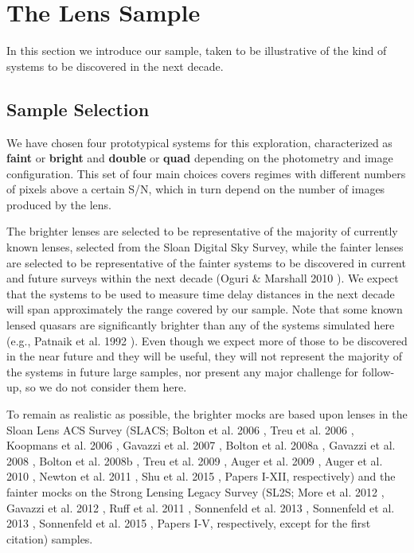 \documentclass[a4paper,11pt]{article}
\begin{document}
{\section{The Lens Sample}

In this section we introduce our sample, taken to be illustrative of the kind of systems to be discovered in the next decade.

\subsection{Sample Selection}

We have chosen four prototypical systems for this exploration,
characterized as \textbf{faint} or \textbf{bright} and \textbf{double}
or \textbf{quad} depending on the photometry and image
configuration. This set of four main choices covers regimes with
different numbers of pixels above a certain S/N, which in turn depend
on the number of images produced by the lens.


The brighter lenses are selected to be representative of the majority
of currently known lenses, selected from the Sloan Digital Sky Survey,
while the fainter lenses are selected to be representative of the
fainter systems to be discovered in current and future surveys within
the next decade (Oguri \& Marshall 2010
\cite{2010MNRAS.405.2579O}). We expect that the systems to be used to
measure time delay distances in the next decade will span
approximately the range covered by our sample. Note that some known
lensed quasars are significantly brighter than any of the systems
simulated here (e.g., Patnaik et al. 1992 \cite{1992MNRAS.259P...1P}). Even though we
expect more of those to be discovered in the near future and they will
be useful, they will not represent the majority of the systems in
future large samples, nor present any major challenge for follow-up,
so we do not consider them here.

To remain as realistic as possible, the brighter mocks are based upon
lenses in the Sloan Lens ACS Survey (SLACS; Bolton et al. 2006
\cite{2006ApJ...638..703B}, Treu et al. 2006
\cite{2006ApJ...640..662T}, Koopmans et al. 2006
\cite{2006ApJ...649..599K}, Gavazzi et al. 2007
\cite{2007ApJ...667..176G}, Bolton et al. 2008a
\cite{2008ApJ...682..964B}, Gavazzi et al. 2008
\cite{2008ApJ...677.1046G}, Bolton et al. 2008b
\cite{2008ApJ...684..248B}, Treu et al. 2009
\cite{2009ApJ...690..670T}, Auger et al. 2009
\cite{2009ApJ...705.1099A}, Auger et al. 2010
\cite{2010ApJ...724..511A}, Newton et al. 2011
\cite{2011ApJ...734..104N}, Shu et al. 2015
\cite{2014arXiv1407.2240S}, Papers I-XII, respectively) and the fainter mocks on the Strong
Lensing Legacy Survey (SL2S; More et al. 2012
\cite{2012ApJ...749...38M}, Gavazzi et al. 2012 \cite{2012ApJ...761..170G},
Ruff et al. 2011 \cite{2011ApJ...727...96R}, Sonnenfeld et al. 2013
\cite{2013ApJ...777...97S}, Sonnenfeld et al. 2013
\cite{2013ApJ...777...98S}, Sonnenfeld et al. 2015
\cite{2015ApJ...800...94S}, Papers I-V, respectively, except for the
first citation) samples.

}
\end{document}
